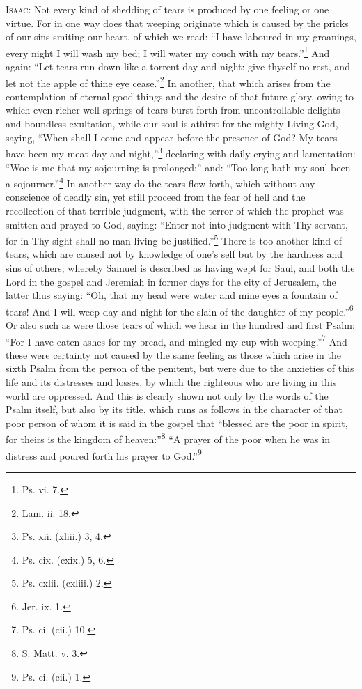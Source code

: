 \textsc{Isaac}: Not every kind of shedding of tears is produced by one feeling or one virtue. For in one way does that weeping originate which is caused by the pricks of our sins smiting our heart, of which we read: “I have laboured in my groanings, every night I will wash my bed; I will water my couch with my tears.”\footnote{Ps. vi. 7.} And again: “Let tears run down like a torrent day and night: give thyself no rest, and let not the apple of thine eye cease.”\footnote{Lam. ii. 18.} In another, that which arises from the contemplation of eternal good things and the desire of that future glory, owing to which even richer well-springs of tears burst forth from uncontrollable delights and boundless exultation, while our soul is athirst for the mighty Living God, saying, “When shall I come and appear before the presence of God? My tears have been my meat day and night,”\footnote{Ps. xii. (xliii.) 3, 4.} declaring with daily crying and lamentation: “Woe is me that my sojourning is prolonged;” and: “Too long hath my soul been a sojourner.”\footnote{Ps. cix. (cxix.) 5, 6.} In another way do the tears flow forth, which without any conscience of deadly sin, yet still proceed from the fear of hell and the recollection of that terrible judgment, with the terror of which the prophet was smitten and prayed to God, saying: “Enter not into judgment with Thy servant, for in Thy sight shall no man living be justified.”\footnote{Ps. cxlii. (cxliii.) 2.} There is too another kind of tears, which are caused not by knowledge of one’s self but by the hardness and sins of others; whereby Samuel is described as having wept for Saul, and both the Lord in the gospel and Jeremiah in former days for the city of Jerusalem, the latter thus saying: “Oh, that my head were water and mine eyes a fountain of tears! And I will weep day and night for the slain of the daughter of my people.”\footnote{Jer. ix. 1.} Or also such as were those tears of which we hear in the hundred and first Psalm: “For I have eaten ashes for my bread, and mingled my cup with weeping.”\footnote{Ps. ci. (cii.) 10.} And these were certainty not caused by the same feeling as those which arise in the sixth Psalm from the person of the penitent, but were due to the anxieties of this life and its distresses and losses, by which the righteous who are living in this world are oppressed. And this is clearly shown not only by the words of the Psalm itself, but also by its title, which runs as follows in the character of that poor person of whom it is said in the gospel that “blessed are the poor in spirit, for theirs is the kingdom of heaven:”\footnote{S. Matt. v. 3.} “A prayer of the poor when he was in distress and poured forth his prayer to God.”\footnote{Ps. ci. (cii.) 1.}

